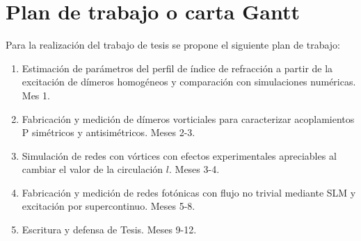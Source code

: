 \documentclass{article}
\begin{document}
\section{Plan de trabajo o carta Gantt}

Para la realización del trabajo de tesis se propone el siguiente plan de trabajo:

\begin{enumerate}
	\item Estimación de parámetros del perfil de índice de refracción a partir de la excitación de dímeros homogéneos y comparación con simulaciones numéricas. Mes 1.
	\item Fabricación y medición de dímeros vorticiales para caracterizar acoplamientos P simétricos y antisimétricos. Meses 2-3.
	\item Simulación de redes con vórtices con efectos experimentales apreciables al cambiar el valor de la circulación $l$. Meses 3-4.
	\item Fabricación y medición de redes fotónicas con flujo no trivial mediante SLM y excitación por supercontinuo. Meses 5-8.
	\item Escritura y defensa de Tesis. Meses 9-12.
\end{enumerate}


\renewcommand\refname{Referencias}




\end{document}
